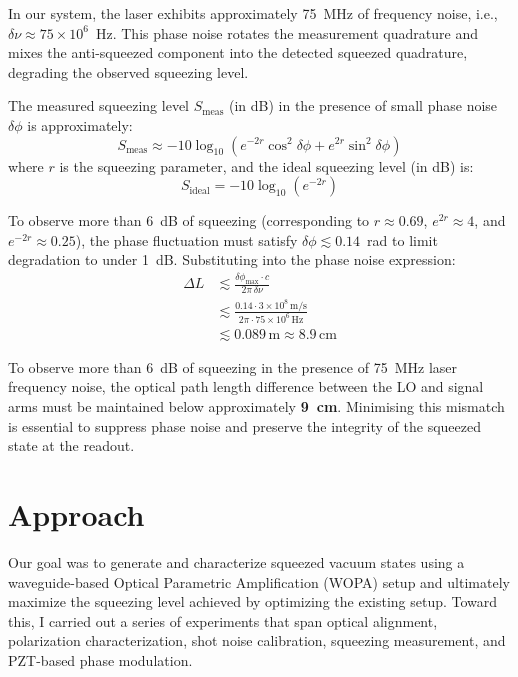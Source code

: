\documentclass[colorlinks=true,pdfstartview=FitV,linkcolor=blue,
citecolor=red,urlcolor=magenta]{ligodoc}
\begin{document}
In our system, the laser exhibits approximately 75~MHz of frequency noise, i.e., \( \delta \nu \approx 75 \times 10^6 \)~Hz. This phase noise rotates the measurement quadrature and mixes the anti-squeezed component into the detected squeezed quadrature, degrading the observed squeezing level.

The measured squeezing level \( S_{\text{meas}} \) (in dB) in the presence of small phase noise \( \delta \phi \) is approximately:
\begin{equation}
    S_{\text{meas}} \approx -10 \log_{10} \left( e^{-2r} \cos^2 \delta \phi + e^{2r} \sin^2 \delta \phi \right)
\end{equation}
where \( r \) is the squeezing parameter, and the ideal squeezing level (in dB) is:
\begin{equation}
    S_{\text{ideal}} = -10 \log_{10}(e^{-2r})
\end{equation}

To observe more than 6~dB of squeezing (corresponding to \( r \approx 0.69 \), \( e^{2r} \approx 4 \), and \( e^{-2r} \approx 0.25 \)), the phase fluctuation must satisfy \( \delta \phi \lesssim 0.14 \)~rad to limit degradation to under 1~dB. Substituting into the phase noise expression:
\begin{align}
    \Delta L &\lesssim \frac{\delta \phi_{\text{max}} \cdot c}{2\pi \, \delta \nu} \\
             &\lesssim \frac{0.14 \cdot 3 \times 10^8 \, \text{m/s}}{2\pi \cdot 75 \times 10^6 \, \text{Hz}} \\
             &\lesssim 0.089 \, \text{m} \approx 8.9 \, \text{cm}
\end{align}

To observe more than 6~dB of squeezing in the presence of 75~MHz laser frequency noise, the optical path length difference between the LO and signal arms must be maintained below approximately \textbf{9~cm}. Minimising this mismatch is essential to suppress phase noise and preserve the integrity of the squeezed state at the readout.

\section{Approach}

Our goal was to generate and characterize squeezed vacuum states using a waveguide-based Optical Parametric Amplification (WOPA) setup and ultimately maximize the squeezing level achieved by optimizing the existing setup. Toward this, I carried out a series of experiments that span optical alignment, polarization characterization, shot noise calibration, squeezing measurement, and PZT-based phase modulation.
\end{document}
